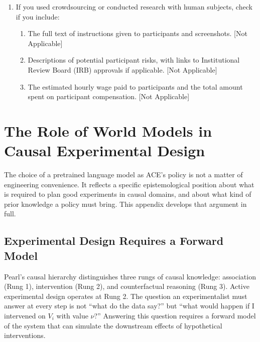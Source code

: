 \documentclass[twoside]{article}
\theoremstyle{plain}
\theoremstyle{definition}
\theoremstyle{remark}
\begin{document}
\begin{enumerate}
  \item If you used crowdsourcing or conducted research with human subjects, check if you include:
  \begin{enumerate}
    \item The full text of instructions given to participants and screenshots. [Not Applicable]
    \item Descriptions of potential participant risks, with links to Institutional Review Board (IRB) approvals if applicable. [Not Applicable]
    \item The estimated hourly wage paid to participants and the total amount spent on participant compensation. [Not Applicable]
  \end{enumerate}

\end{enumerate}


\clearpage
\onecolumn
\appendix
{}


\section{The Role of World Models in Causal Experimental Design}
\label{app:world-models}

The choice of a pretrained language model as ACE's policy is not a matter of engineering convenience. It reflects a specific epistemological position about what is required to plan good experiments in causal domains, and about what kind of prior knowledge a policy must bring. This appendix develops that argument in full.

\subsection{Experimental Design Requires a Forward Model}

Pearl's causal hierarchy \citep{pearl2009causality,pearl2018book} distinguishes three rungs of causal knowledge: association (Rung 1), intervention (Rung 2), and counterfactual reasoning (Rung 3). Active experimental design operates at Rung 2. The question an experimentalist must answer at every step is not ``what do the data say?'' but ``what would happen if I intervened on $V_i$ with value $\nu$?'' Answering this question requires a forward model of the system that can simulate the downstream effects of hypothetical interventions.
\end{document}
